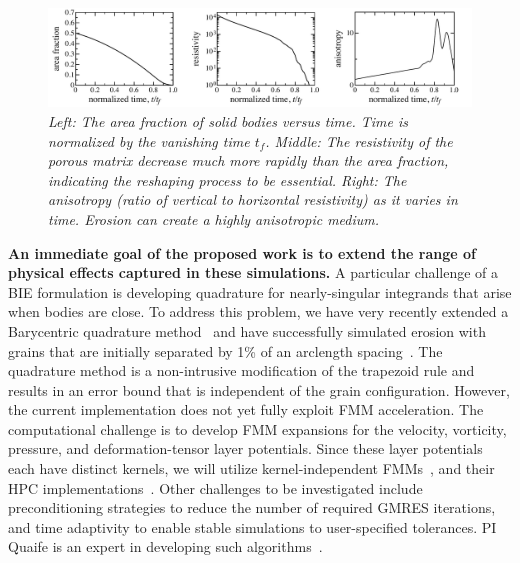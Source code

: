 \documentclass[11pt]{article}
\begin{document}
\begin{figure}%
\begin{center}
\includegraphics[width = 0.99 \textwidth]{./figs/fig3.pdf}
  \caption{\label{fig3} \em Left: The area fraction of solid bodies versus time. Time is normalized by the vanishing time $t_f$.  Middle: The resistivity of the porous matrix decrease much more rapidly than the area fraction, indicating the reshaping process to be essential. Right: The anisotropy (ratio of vertical to horizontal resistivity) as it varies in time. Erosion can create a highly anisotropic medium.} 
\end{center}
\end{figure}

{\bf An immediate goal of the proposed work is to extend the range of physical effects captured in these simulations.} A particular challenge of a BIE formulation is developing quadrature for nearly-singular integrands that arise when bodies are close. To address this problem, we have very recently extended a Barycentric quadrature method~\cite{bar2014, bar-wu-vee2015} and have successfully simulated erosion with grains that are initially separated by 1\% of an arclength spacing~\cite{chi-moo-qua2019}. The quadrature method is a non-intrusive modification of the trapezoid rule and results in an error bound that is independent of the grain configuration. However, the current implementation does not yet fully exploit FMM acceleration. The computational challenge is to develop FMM expansions for the velocity, vorticity, pressure, and deformation-tensor layer potentials. Since these layer potentials each have distinct kernels, we will utilize kernel-independent FMMs~\cite{yin-bir-zor2004, fon-dar2009}, and their HPC implementations~\cite{pvfmm}. Other challenges to be investigated include preconditioning strategies to reduce the number of required GMRES iterations, and time adaptivity to enable stable simulations to user-specified tolerances. PI Quaife is an expert in developing such algorithms~\cite{qua-bir2015b, qua-bir2016, qua-bir2015a, qua-cou-dar2018}.
\end{document}
